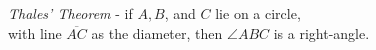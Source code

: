 \documentclass[preview]{standalone}
\begin{document}
\begin{center}
\textit{Thales' Theorem} - if $A,B$, and $C$ lie on a circle,\\ with line $\overline{AC}$ as the diameter, then $\angle ABC$ is a right-angle.
\end{center}
\end{document}
